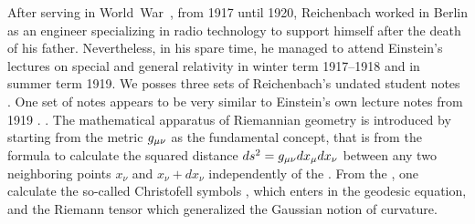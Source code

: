 \documentclass[draft]{article}
\newcommand{\xdx}{\ensuremath{x_\nu} and \ensuremath{x_\nu + dx_\nu}\xspace}
\begin{document}

After serving in World~War~, from 1917 until 1920, Reichenbach worked in Berlin as an engineer specializing in radio technology to support himself after the death of his father. Nevertheless, in his spare time, he managed to attend Einstein's lectures on special and general relativity in winter term 1917--1918 and in summer term 1919. We posses three sets of Reichenbach's undated student notes \citep[028-01-04, 028-01-03, 028-01-01]{HR}. One set of notes \citep[028-01-01]{HR} appears to be very similar to Einstein's own lecture notes from 1919 \citep{Einstein1919c}. . The mathematical apparatus of Riemannian geometry is introduced by starting from the metric $g_{\mu\nu}$ as the fundamental concept, that is from the formula to calculate the squared distance $ds^2=g_{\mu\nu} dx_\mu dx_\nu$ between any two neighboring points \xdx independently of the \cs. From the \gmn, one calculate the so-called Christofell symbols \christoffel{\mu}{\nu}{\tau}, which enters in the geodesic equation, and the Riemann tensor \rite which generalized the Gaussian notion of curvature. 
\end{document}
